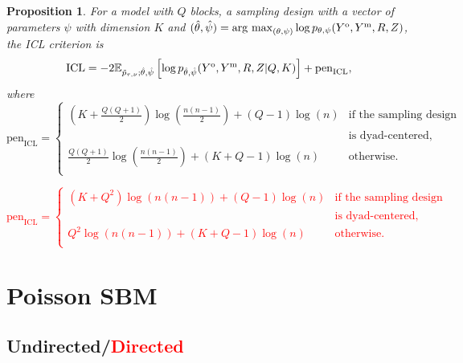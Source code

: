 \documentclass[10pt]{article}
\newcommand{\1}{\mathds{1}}
\newcommand{\MA}{Y}
\newcommand{\MAO}{\MA^\text{\rm o}}
\newcommand{\MAM}{\MA^\text{\rm m}}
\newcommand{\argmax}{\mathop{\mathrm{arg\ max}}}
\newtheorem{proposition}{Proposition}
\begin{document}
\begin{proposition}
\label{prop:ICL_NMAR}
For  a model  with $Q$  blocks,  a sampling  design with  a vector  of
parameters        $\psi$        with       dimension       $K$        and
$(\hat{\theta},\hat{\psi})=\argmax_{(\theta,   \psi)}\log   p_{\theta,
  \psi}(\MAO,\MAM, R, Z)$, the ICL criterion is
\begin{equation}\nonumber
  \mathrm{ICL}        =       -2\mathbb{E}_{\tilde        p_{\tau,\nu};
    \hat{\theta},\hat{\psi}}\left[\log p_{\hat{\theta},\hat{\psi}}(\MAO,\MAM, R, Z | Q, K)\right] + \mathrm{pen}_{\text{ICL}},
\end{equation}
where
\begin{equation}\nonumber
  \mathrm{pen}_{\text{ICL}} = \left\{
    \begin{array}{ll}
      \left(K + \frac{Q(Q+1)}{2}\right)\log \left(\frac{n(n-1)}{2}\right) + (Q-1)\log (n) &  \text{if the sampling design} \\
                                                                                          & \text{is dyad-centered,}\\
      \frac{Q(Q+1)}{2}\log\left( \frac{n(n-1)}{2} \right)+ (K + Q-1)\log (n) & \text{otherwise.}\\
    \end{array}
  \right.
\end{equation}

\textcolor{red}{\begin{equation}\nonumber
  \mathrm{pen}_{\text{ICL}} = \left\{
    \begin{array}{ll}
      \left(K + Q^2\right)\log \left(n(n-1)\right) + (Q-1)\log (n) &  \text{if the sampling design} \\
                                                                                          & \text{is dyad-centered,}\\
      Q^2\log\left( n(n-1) \right)+ (K + Q-1)\log (n) & \text{otherwise.}\\
    \end{array}
  \right.
\end{equation}}
\end{proposition}

\section{Poisson SBM}
\subsection{Undirected/\textcolor{red}{Directed}}
\end{document}
